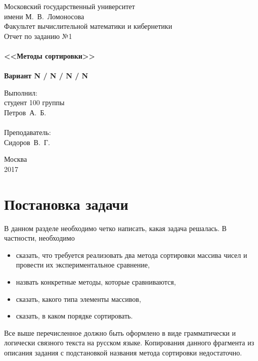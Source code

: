 \documentclass[a4paper,12pt,titlepage,final]{article}
\begin{document}
\begin{titlepage}
    \begin{center}
	{\small \sc Московский государственный университет \\имени М.~В.~Ломоносова\\
	Факультет вычислительной математики и кибернетики\\}
	\vfill
	{\Large \sc Отчет по заданию №1}\\
	~\\
	{\large \bf <<Методы сортировки>>}\\ 
	~\\
	{\large \bf Вариант N / N / N / N}
    \end{center}
    \begin{flushright}
	\vfill {Выполнил:\\
	студент 100 группы\\
	Петров~А.~Б.\\
	~\\
	Преподаватель:\\
	Сидоров~В.~Г.}
    \end{flushright}
    \begin{center}
	\vfill
	{\small Москва\\2017}
    \end{center}
\end{titlepage}

\tableofcontents
\newpage

\section{Постановка задачи}

В данном разделе необходимо четко написать, какая задача решалась. В частности, необходимо
\begin{itemize}
\item сказать, что требуется реализовать два метода сортировки массива чисел и провести их
    экспериментальное сравнение,
\item назвать конкретные методы, которые сравниваются,
\item сказать, какого типа элементы массивов,
\item сказать, в каком порядке сортировать.
\end{itemize}
Все выше перечисленное должно быть оформлено в виде грамматически и логически
связного текста на русском языке. Копирования данного фрагмента из описания задания 
с подстановкой названия метода сортировки недостаточно.
\end{document}
